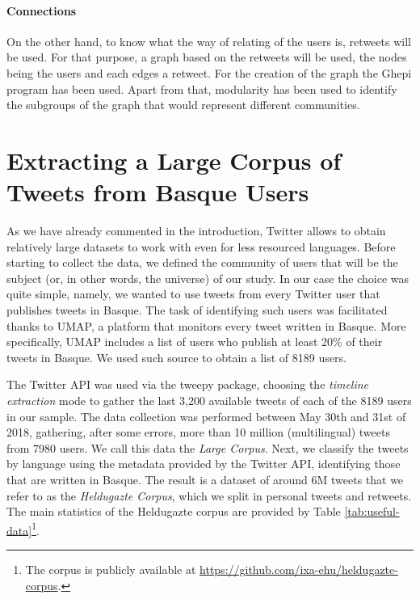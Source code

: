 \documentclass[information,article,submit,moreauthors,pdftex,10pt,a4paper]{Definitions/mdpi}
\begin{document}
\paragraph{Connections}

On the other hand, to know what the way of relating of the users is, retweets will be used. For that purpose, a graph based on the retweets will be used, the nodes being the users and each edges a retweet. For the creation of the graph the Ghepi program \citep{bastian2009gephi} has been used. Apart from that, modularity \citep{blondel2008fast} has been used to identify the subgroups of the graph that would represent different communities.



\section{Extracting a Large Corpus of Tweets from Basque Users}\label{sec:data-extraction}

As we have already commented in the introduction, Twitter allows to obtain relatively large datasets to work with even for less resourced languages. Before starting to collect the data, we defined the community of users that will be the subject (or, in other words, the universe) of our study. In our case the choice was quite simple, namely, we wanted to use tweets from every Twitter user that publishes tweets in Basque. The task of identifying such users was facilitated thanks to UMAP, a platform that monitors every tweet written in Basque. More specifically, UMAP includes a list of users who publish at least 20\% of their tweets in Basque. We used such source to obtain a list of 8189 users.

The Twitter API was used via the tweepy package, choosing the \textit{timeline extraction} mode to gather the last 3,200 available tweets of each of the 8189 users in our sample. The data collection was performed between May 30th and 31st of 2018, gathering, after some errors, more than 10 million (multilingual) tweets from 7980 users. We call this data the \emph{Large Corpus}. Next, we classify the tweets by language using the metadata provided by the Twitter API, identifying those that are written in Basque. The result is a dataset of around 6M tweets that we refer to as the \emph{Heldugazte Corpus}, which we split in personal tweets and retweets. The main statistics of the Heldugazte corpus are provided by Table \ref{tab:useful-data}\footnote{The corpus is publicly available at \url{https://github.com/ixa-ehu/heldugazte-corpus}.}.
\end{document}
